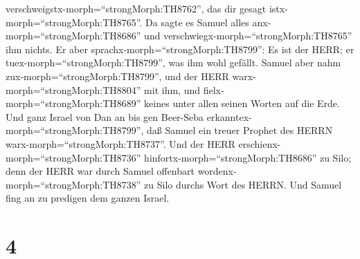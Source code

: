 verschweigstx-morph=``strongMorph:TH8762'', das dir gesagt
istx-morph=``strongMorph:TH8765''.  Da sagte es Samuel
alles anx-morph=``strongMorph:TH8686'' und
verschwiegx-morph=``strongMorph:TH8765'' ihm nichts. Er aber
sprachx-morph=``strongMorph:TH8799'': Es ist der HERR; er
tuex-morph=``strongMorph:TH8799'', was ihm wohl gefällt. 
Samuel aber nahm zux-morph=``strongMorph:TH8799'', und der HERR
warx-morph=``strongMorph:TH8804'' mit ihm, und
fielx-morph=``strongMorph:TH8689'' keines unter allen seinen Worten auf
die Erde.  Und ganz Israel von Dan an bis gen Beer-Seba
erkanntex-morph=``strongMorph:TH8799'', daß Samuel ein treuer Prophet
des HERRN warx-morph=``strongMorph:TH8737''.  Und der HERR
erschienx-morph=``strongMorph:TH8736''
hinfortx-morph=``strongMorph:TH8686'' zu Silo; denn der HERR war durch
Samuel offenbart wordenx-morph=``strongMorph:TH8738'' zu Silo durchs
Wort des HERRN. Und Samuel fing an zu predigen dem ganzen Israel.

\hypertarget{section-3}{%
\section{4}\label{section-3}}

